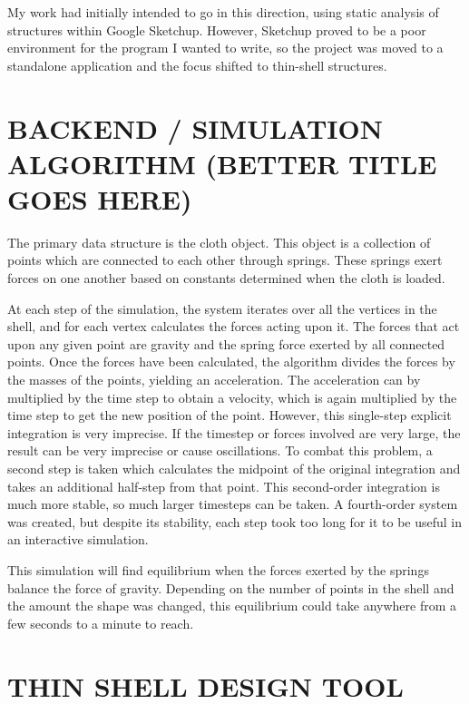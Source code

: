 \documentclass{thesis}
\begin{document}
My work had initially intended to go in this direction, using static analysis of structures within
Google Sketchup.  However, Sketchup proved to be a poor environment for the program I wanted to write, so
the project was moved to a standalone application and the focus shifted to thin-shell structures.

\chapter{BACKEND / SIMULATION ALGORITHM (BETTER TITLE GOES HERE)}
The primary data structure is the cloth object.  This object is a collection of points which are connected to each other through springs.
These springs exert forces on one another based on constants determined when the cloth is loaded.

At each step of the simulation, the system iterates over all the vertices in the shell, and for each vertex calculates the forces acting
upon it.  The forces that act upon any given point are gravity and the spring force exerted by all connected points.  Once the forces have
been calculated, the algorithm divides the forces by the masses of the points, yielding an acceleration.  The acceleration can by multiplied
by the time step to obtain a velocity, which is again multiplied by the time step to get the new position of the point.  However, this
single-step explicit integration is very imprecise.  If the timestep or forces involved are very large, the result can be very imprecise or
cause oscillations.  To combat this problem, a second step is taken which calculates the midpoint of the original integration and takes an
additional half-step from that point.  This second-order integration is much more stable, so much larger timesteps can be taken.  A
fourth-order system was created, but despite its stability, each step took too long for it to be useful in an interactive simulation.

This simulation will find equilibrium when the forces exerted by the springs balance the force of gravity.  Depending on the number of
points in the shell and the amount the shape was changed, this equilibrium could take anywhere from a few seconds to a minute to reach.

\chapter{THIN SHELL DESIGN TOOL}
\end{document}
